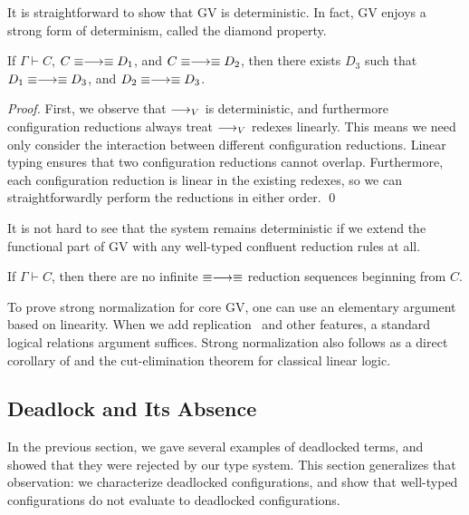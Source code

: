 \documentclass[oribibl,orivec,envcountsame]{llncs}
\begin{document}
It is straightforward to show that GV is deterministic. In fact, GV enjoys a strong form of
determinism, called the diamond property.
\begin{theorem}
  If $\Gamma \vdash C$, $C \equiv\longrightarrow\equiv D_1$, and $C \equiv\longrightarrow\equiv D_2$, then there
  exists $D_3$ such that $D_1 \equiv\longrightarrow\equiv D_3$, and $D_2 \equiv\longrightarrow\equiv D_3$.
\end{theorem}
\begin{proof}
First, we observe that $\longrightarrow_V$ is deterministic, and furthermore configuration reductions always
treat $\longrightarrow_V$ redexes linearly. This means we need only consider the interaction between different
configuration reductions.
%
Linear typing ensures that two configuration reductions cannot overlap. Furthermore, each
configuration reduction is linear in the existing redexes, so we can straightforwardly perform the
reductions in either order. \qed
\end{proof}
%
It is not hard to see that the system remains deterministic if we extend the functional part of GV
with any well-typed confluent reduction rules at all.

\begin{theorem}
  If $\Gamma \vdash C$, then there are no infinite $\equiv\longrightarrow\equiv$ reduction sequences
  beginning from $C$.
\end{theorem}
To prove strong normalization for core GV, one can use an elementary argument based on
linearity. When we add replication~ and other features, a standard logical relations
argument suffices. Strong normalization also follows as a direct corollary of
 and the cut-elimination theorem for classical linear logic.

\subsection{Deadlock and Its Absence}\label{sec:gv-deadlock}
\newcommand{\blockedp}{\mathsf{blocked}}
\newcommand{\depp}{\mathsf{depends}}
\newcommand{\deadlockp}{\ensuremath{\mathsf{deadlocked}}}

In the previous section, we gave several examples of deadlocked terms, and showed that they were
rejected by our type system.  This section generalizes that observation: we characterize deadlocked
configurations, and show that well-typed configurations do not evaluate to deadlocked
configurations.
\end{document}
